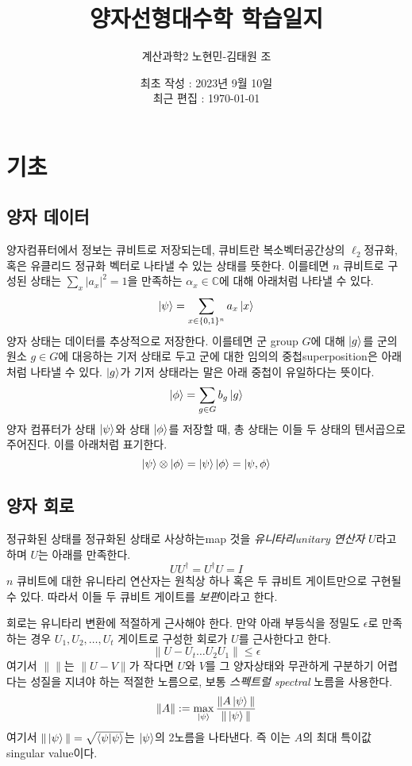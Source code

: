 \documentclass[a4paper,atbegshi,chapter]{oblivoir}
\title{\Large 양자선형대수학 학습일지}
\author{계산과학2 노현민-김태원 조}
\date{최초 작성 : 2023년 9월 10일 \\ 최근 편집 : \today}
\begin{document}
\maketitle
\chapter{기초}
\section{양자 데이터}
양자컴퓨터에서 정보는 큐비트로 저장되는데, 큐비트란 복소벡터공간상의
$\ell_2$정규화, 혹은 유클리드 정규화 벡터로 나타낼 수 있는 상태를 뜻한다.
이를테면 $n$ 큐비트로 구성된 상태는 $\sum_x|a_x|^2=1$을 만족하는
$\alpha_x\in\mathbb{C}$에 대해 아래처럼 나타낼 수 있다.
\[
  \ket{\psi}=\sum_{x\in\{0,1\}^n}a_x\ket{x}
\]
양자 상태는 데이터를 추상적으로 저장한다. 이를테면 군{\footnotesize 
group} $G$에 대해 $\ket{g}$를 군의 원소 $g\in G$에 대응하는 기저 상태로
두고 군에 대한 임의의 중첩{\footnotesize superposition}은 아래처럼 나타낼 수
있다. $\ket{g}$가 기저 상태라는 말은 아래 중첩이 유일하다는 뜻이다.
\[
  \ket{\phi}=\sum_{g\in G}b_g\ket{g}
\]
양자 컴퓨터가 상태 $\ket{\psi}$와 상태 $\ket{\phi}$를 저장할 때, 총 상태는
이들 두 상태의 텐서곱으로 주어진다. 이를 아래처럼 표기한다.
\[
  \ket{\psi}\otimes\ket{\phi}=\ket{\psi}\ket{\phi}=\ket{\psi,\phi}
\]
\section{양자 회로}
정규화된 상태를 정규화된 상태로 사상하는{\footnotesize map} 것을
\emph{유니타리{\footnotesize unitary} 연산자} $U$라고 하며 $U$는 아래를 만족한다.
\[
  UU^{\dagger}=U^{\dagger}U=I
\]
$n$ 큐비트에 대한 유니타리 연산자는 원칙상 하나 혹은 두 큐비트 게이트만으로
구현될 수 있다. 따라서 이들 두 큐비트 게이트를 \emph{보편}이라고 한다.

회로는 유니타리 변환에 적절하게 근사해야 한다. 만약 아래 부등식을 정밀도 
$\epsilon$로 만족하는 경우 $U_1,U_2,\ldots,U_t$ 게이트로 구성한 회로가 
$U$를 근사한다고 한다.
\[
  \|U-U_t\ldots U_2U_1\|\leq\epsilon
\]
여기서 $\|\|$는 $\|U-V\|$가 작다면 $U$와 $V$를 그 양자상태와 무관하게 구분하기
어렵다는 성질을 지녀야 하는 적절한 노름으로, 보통 \emph{스펙트럴\footnotesize
spectral} 노름을 사용한다.
\[
  \|A\|:=\max_{\ket{\psi}}\frac{\|A\ket{\psi}\|}{\|\ket{\psi}\|}
\]
여기서 $\|\ket{\psi}\|=\sqrt{\braket{\psi|\psi}}$는 $\ket{\psi}$의 2노름을
나타낸다. 즉 이는 $A$의 최대 특이값{\footnotesize singular value}이다.
\end{document}
